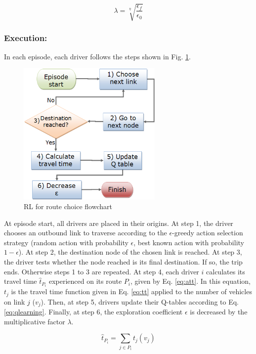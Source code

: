 \documentclass{RITA}
\newcommand{\route}[1]{\ensuremath{P_#1}}	%
\newcommand{\travTime}{\ensuremath{t_j}} 	%
\newcommand{\veh}{\ensuremath{v}}		%
\newcommand{\att}[1]{\ensuremath{\hat{t}_{#1}}}		%
\newcommand{\numepis}{\ensuremath{\eta}}	%
\begin{document}
\begin{equation}
\label{eq:lambda}
\lambda = \sqrt[\numepis]{\frac{\epsilon_f}{\epsilon_0}}
\end{equation}

\subsubsection{Execution:}

In each episode, each driver follows the steps shown in Fig. \ref{fig:flowchart}.

\begin{figure}[ht]
    \centerline{\includegraphics[width=7cm]{img/flowchart3.png}}
    \caption{RL for route choice flowchart}
    \label{fig:flowchart}
\end{figure}

At episode start, all drivers are placed in their origins. At step 1, the driver chooses an outbound link to traverse according to the $\epsilon$-greedy action selection strategy (random action with probability $\epsilon$, best known action with probability $1 - \epsilon$). At step 2, the destination node of the chosen link is reached. At step 3, the driver tests whether the node reached is its final destination. If so, the trip ends. Otherwise steps 1 to 3 are repeated. At step 4, each driver $i$ calculates its travel time $\att{\route{i}}$ experienced on its route $\route{i}$, given by Eq. \eqref{eq:att}. In this equation, $\travTime$ is the travel time function given in Eq. \eqref{eq:tt} applied to the number of vehicles on link $j$ ($\veh_j$). Then, at step 5, drivers update their Q-tables according to Eq. \eqref{eq:qlearning}. Finally, at step 6, the exploration coefficient $\epsilon$ is decreased by the multiplicative factor $\lambda$.

\begin{equation}
\label{eq:att}
\att{\route{i}} = \sum_{j \in \route{i}} \travTime(\veh_j)
\end{equation}
\end{document}
